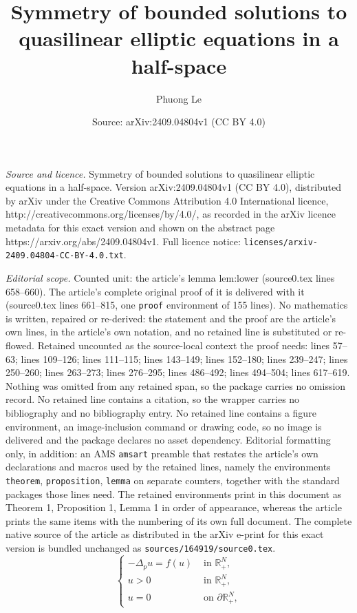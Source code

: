 \documentclass[10pt,a4paper]{amsart}
\title{Symmetry of bounded solutions to quasilinear elliptic equations in a half-space}
\author{Phuong Le}
\date{Source: arXiv:2409.04804v1 (CC BY 4.0)}
\begin{document}
\maketitle

\noindent\emph{Source and licence.} Symmetry of bounded solutions to quasilinear elliptic equations in a half-space. Version arXiv:2409.04804v1 (CC BY 4.0), distributed by arXiv under the Creative Commons Attribution 4.0 International licence, http://creativecommons.org/licenses/by/4.0/, as recorded in the arXiv licence metadata for this exact version and shown on the abstract page https://arxiv.org/abs/2409.04804v1. Full licence notice: \texttt{licenses/arxiv-2409.04804-CC-BY-4.0.txt}.\par\smallskip

\noindent\textit{Editorial scope.} Counted unit: the article's lemma lem:lower (source0.tex lines 658--660). The article's complete original proof of it is delivered with it (source0.tex lines 661--815, one \texttt{proof} environment of 155 lines). No mathematics is written, repaired or re-derived: the statement and the proof are the article's own lines, in the article's own notation, and no retained line is substituted or re-flowed.  Retained uncounted as the source-local context the proof needs: lines 57--63; lines 109--126; lines 111--115; lines 143--149; lines 152--180; lines 239--247; lines 250--260; lines 263--273; lines 276--295; lines 486--492; lines 494--504; lines 617--619.  Nothing was omitted from any retained span, so the package carries no omission record.  No retained line contains a citation, so the wrapper carries no bibliography and no bibliography entry.  No retained line contains a figure environment, an image-inclusion command or drawing code, so no image is delivered and the package declares no asset dependency.  Editorial formatting only, in addition: an AMS \texttt{amsart} preamble that restates the article's own declarations and macros used by the retained lines, namely the environments \texttt{theorem}, \texttt{proposition}, \texttt{lemma} on separate counters, together with the standard packages those lines need.  The retained environments print in this document as Theorem 1, Proposition 1, Lemma 1 in order of appearance, whereas the article prints the same items with the numbering of its own full document.  The complete native source of the article as distributed in the arXiv e-print for this exact version is bundled unchanged as \texttt{sources/164919/source0.tex}.
	\begin{equation}\label{main}
		\begin{cases}
			-\Delta_p u = f(u) &\text{ in } \mathbb{R}^N_+,\\
			u > 0 &\text{ in } \mathbb{R}^N_+,\\
			u = 0 &\text{ on } \partial\mathbb{R}^N_+,
		\end{cases}
	\end{equation}
\end{document}
